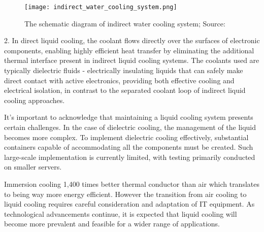 \documentclass[
  a4paper,  %
  twoside,  %
  bibliography=totoc,
  headsepline,
  cleardoublepage=empty,
  parskip=half,
  draft=false
]{scrbook}
\begin{document}
\begin{figure}
	\centering
	\texttt{[image: indirect\_water\_cooling\_system.png]}
	\caption{The schematic diagram of indirect water cooling system; Source: \cite{khalaj2017review}}
	\label{indirect_cooling}
\end{figure}

2. In direct liquid cooling, the coolant flows directly over the surfaces of electronic components, enabling highly efficient heat transfer by eliminating the additional thermal interface present in indirect liquid cooling systems. The coolants used are typically dielectric fluids - electrically insulating liquids that can safely make direct contact with active electronics, providing both effective cooling and electrical isolation, in contrast to the separated coolant loop of indirect liquid cooling approaches\cite{khalaj2017review}\cite{submerImmersionCooling}.

It's important to acknowledge that maintaining a liquid cooling system presents certain challenges\cite{azarifar2024liquid}. In the case of dielectric cooling, the management of the liquid becomes more complex\cite{submerImmersionCooling}. To implement dielectric cooling effectively, substantial containers capable of accommodating all the components must be created. Such large-scale implementation is currently limited, with testing primarily conducted on smaller servers.

Immersion cooling 1,400 times better thermal conductor than air\cite{submerImmersionCooling} which translates to being way more energy efficient. However the transition from air cooling to liquid cooling requires careful consideration and adaptation of IT equipment. As technological advancements continue, it is expected that liquid cooling will become more prevalent and feasible for a wider range of applications.


\end{document}

